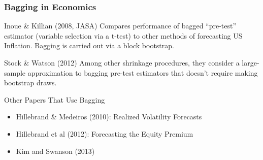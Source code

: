 \documentclass[handout]{beamer}
\begin{document}
\begin{frame}
	\frametitle{Bagging in Economics}
	\begin{block}
		{Inoue \& Killian (2008, JASA)}
		Compares performance of bagged ``pre-test'' estimator (variable selection via a t-test) to other methods of forecasting US Inflation. Bagging is carried out via a block bootstrap.
	\end{block}
	\begin{block}
		{Stock \& Watson (2012)}
		Among other shrinkage procedures, they consider a large-sample approximation to bagging pre-test estimators that doesn't require making bootstrap draws.
	\end{block}
	\begin{block}
		{Other Papers That Use Bagging}
		\begin{itemize}
			\item Hillebrand \& Medeiros (2010): Realized Volatility Forecasts
			\item Hillebrand et al (2012): Forecasting the Equity Premium
			\item \alert{Kim and Swanson (2013)}
		\end{itemize}
	\end{block}
\end{frame}
\end{document}
